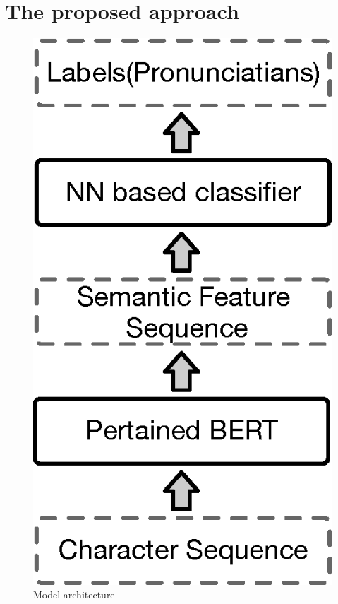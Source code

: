 \documentclass[a4paper]{article}
\begin{document}
\section{The proposed approach}

\begin{figure}[t]
	\centering
	\includegraphics[scale=0.4]{pics/architecture2.eps}
	\caption{Model architecture}
	\label{fig:model_architecture}
\end{figure}
\end{document}
